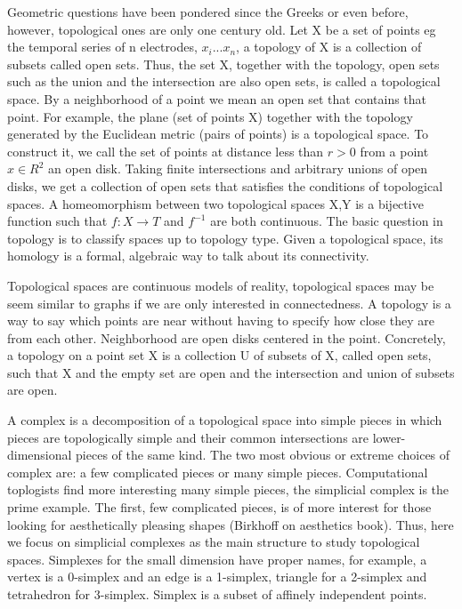 \documentclass[onecollarge,runningheads]{svjour2}
\begin{document}
\citep{edelsbrunner2010computational}
Geometric questions have been pondered since the Greeks or even before, however, topological ones are only one century old. 
Let X be a set of points eg the temporal series of n electrodes, $x_i ... x_n$, a topology of X is a collection of subsets called open sets. Thus, the set X, together with the topology, open sets such as the union and the intersection are also open sets, is called a topological space. By a neighborhood of a point we mean an open set that contains that point. For example, the plane (set of points X) together with the topology generated by the Euclidean metric (pairs of points) is a topological space. To construct it, we call the set of points at distance less than $r > 0$ from a point $x \in R^2$ an open disk. Taking finite intersections and arbitrary unions of open disks, we get a
collection of open sets that satisfies the conditions of topological spaces. A homeomorphism between two topological spaces X,Y is a bijective function such that $f:X \to T$ and $f^{-1}$ are both continuous. 
The basic question in topology is to classify spaces up to topology type.
Given a topological space, its homology is a formal, algebraic way to talk about its connectivity.

Topological spaces are continuous models of reality, topological spaces may be seem similar to graphs if we are only interested in connectedness. A topology is a way to say which points are near without having to specify how close they are from each other. Neighborhood are open disks centered in the point. Concretely, a topology on a point set X is a collection U of subsets of X, called open sets, such that X and the empty set are open and the intersection and union of subsets are open.


A complex is a decomposition of a topological space into simple pieces in which pieces are topologically simple and their common intersections are lower-dimensional pieces of the same kind. The two most obvious or extreme choices of complex are: a few complicated pieces or many simple pieces. Computational toplogists find more interesting many simple pieces, the simplicial complex is the prime example. The first, few complicated pieces, is of more interest for those looking for aesthetically pleasing shapes (Birkhoff on aesthetics book).
Thus, here we focus on simplicial complexes as the main structure to study topological spaces. Simplexes for the small dimension have proper names, for example, a vertex is a 0-simplex and an edge is a 1-simplex, triangle for a 2-simplex and tetrahedron for 3-simplex. Simplex is a subset of affinely independent points.
\end{document}
